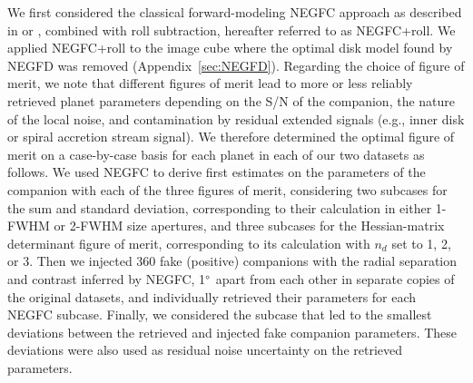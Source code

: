 \documentclass[longauth]{aa}
\begin{document}
\begin{appendix}
We first considered the classical forward-modeling NEGFC approach as described in \citet{Lagrange2010} or \citet{Wertz2017}, combined with roll subtraction, hereafter referred to as NEGFC+roll. We applied NEGFC+roll to the image cube where the optimal disk model found by NEGFD was removed (Appendix~\ref{sec:NEGFD}).
Regarding the choice of figure of merit, we note that different figures of merit lead to more or less reliably retrieved planet parameters depending on the S/N of the companion, the nature of the local noise, and contamination by residual extended signals (e.g., inner disk or spiral accretion stream signal). We therefore determined the optimal figure of merit on a case-by-case basis for each planet in each of our two datasets as follows. %
We used NEGFC to derive first estimates on the parameters of the companion with each of the three figures of merit, considering two subcases for the sum and standard deviation, corresponding to their calculation in either 1-FWHM or 2-FWHM size apertures, and three subcases for the Hessian-matrix determinant figure of merit, corresponding to its calculation with $n_d$ set to 1, 2, or 3. Then we injected 360 fake (positive) companions with the radial separation and contrast inferred by NEGFC, 1$^\circ$ apart from each other in separate copies of the original datasets, and individually retrieved their parameters for each NEGFC subcase.
Finally, we considered the subcase that led to the smallest deviations between the retrieved and injected fake companion parameters. These deviations were also used as residual noise uncertainty on the retrieved parameters.


\end{appendix}
\end{document}

